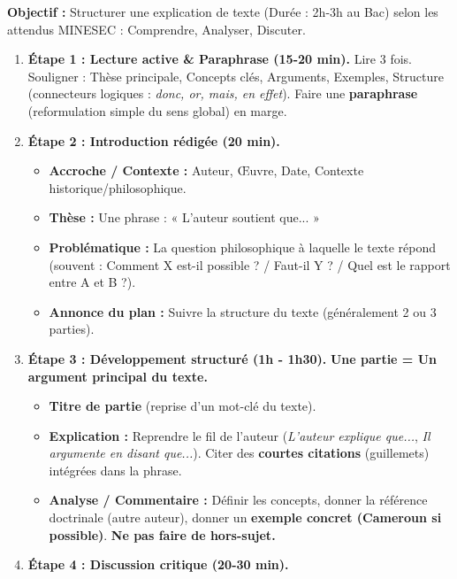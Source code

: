 \documentclass[11pt]{article}
\begin{document}
\begin{methode}
    \textbf{Objectif :} Structurer une explication de texte (Durée : 2h-3h au Bac) selon les attendus MINESEC : Comprendre, Analyser, Discuter.
    \begin{enumerate}
        \item \textbf{Étape 1 : Lecture active \& Paraphrase (15-20 min).} Lire 3 fois. Souligner : Thèse principale, Concepts clés, Arguments, Exemples, Structure (connecteurs logiques : \emph{donc, or, mais, en effet}). Faire une \textbf{paraphrase} (reformulation simple du sens global) en marge.
        \item \textbf{Étape 2 : Introduction rédigée (20 min).} 
            \begin{itemize}
                \item \textbf{Accroche / Contexte :} Auteur, Œuvre, Date, Contexte historique/philosophique.
                \item \textbf{Thèse :} Une phrase : « L'auteur soutient que... »
                \item \textbf{Problématique :} La question philosophique à laquelle le texte répond (souvent : Comment X est-il possible ? / Faut-il Y ? / Quel est le rapport entre A et B ?).
                \item \textbf{Annonce du plan :} Suivre la structure du texte (généralement 2 ou 3 parties).
            \end{itemize}
        \item \textbf{Étape 3 : Développement structuré (1h - 1h30).} \textbf{Une partie = Un argument principal du texte.}
            \begin{itemize}
                \item \textbf{Titre de partie} (reprise d'un mot-clé du texte).
                \item \textbf{Explication :} Reprendre le fil de l'auteur (\emph{L'auteur explique que...}, \emph{Il argumente en disant que...}). Citer des \textbf{courtes citations} (guillemets) intégrées dans la phrase.
                \item \textbf{Analyse / Commentaire :} Définir les concepts, donner la référence doctrinale (autre auteur), donner un \textbf{exemple concret (Cameroun si possible)}. \textbf{Ne pas faire de hors-sujet.}
            \end{itemize}
        \item \textbf{Étape 4 : Discussion critique (20-30 min).} 

\end{enumerate}
\end{methode}
\end{document}
